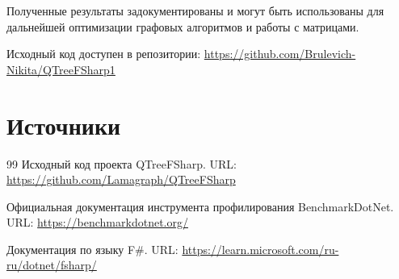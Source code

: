 \documentclass[a4paper]{article}
\begin{document}
Полученные результаты задокументированы и могут быть использованы для дальнейшей оптимизации графовых алгоритмов и работы с матрицами.

Исходный код доступен в репозитории: \url{https://github.com/Brulevich-Nikita/QTreeFSharp1}

\section*{Источники}
\begin{thebibliography}{99}
 Исходный код проекта QTreeFSharp. URL: \url{https://github.com/Lamagraph/QTreeFSharp}

 Официальная документация инструмента профилирования BenchmarkDotNet. URL: \url{https://benchmarkdotnet.org/}

 Документация по языку F\#. URL: \url{https://learn.microsoft.com/ru-ru/dotnet/fsharp/}
\end{thebibliography}
\end{document}
